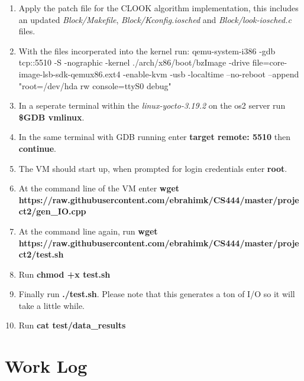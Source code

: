 \documentclass[10pt,onecolumn,draftclsnofoot]{IEEEtran} %
\begin{document}
\begin{singlespace}
	\begin{enumerate}
                \item Apply the patch file for the CLOOK algorithm implementation, this includes an updated \textit{Block/Makefile}, \textit{Block/Kconfig.iosched} and \textit{Block/look-iosched.c} files. 
                \item With the files incorperated into the kernel run: qemu-system-i386 -gdb tcp::5510 -S -nographic -kernel ./arch/x86/boot/bzImage -drive file=core-image-lsb-sdk-qemux86.ext4 -enable-kvm -usb -localtime --no-reboot --append "root=/dev/hda rw console=ttyS0 debug"
                \item In a seperate terminal within the \textit{linux-yocto-3.19.2} on the os2 server run \textbf{\$GDB vmlinux}.
		\item In the same terminal with GDB running enter \textbf{target remote: 5510} then \textbf{continue}.
		\item The VM should start up, when prompted for login credentials enter \textbf{root}.
		\item At the command line of the VM enter \textbf{wget https://raw.githubusercontent.com/ebrahimk/CS444/master/project2/gen\_IO.cpp} 
		\item At the command line again, run \textbf{wget https://raw.githubusercontent.com/ebrahimk/CS444/master/project2/test.sh}
		\item Run \textbf{chmod +x test.sh}
		\item Finally run \textbf{./test.sh}. Please note that this generates a ton of I/O so it will take a little while. 
		\item Run \textbf{cat test/data\_results}
        \end{enumerate}
	

\newpage
\section{\bf Work Log}

                

\newpage


\end{singlespace}
\restoregeometry
\end{document}
